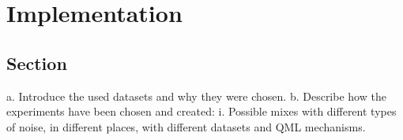 \chapter{Implementation}\label{chapter:implementation}

\section{Section}
a.	Introduce the used datasets and why they were chosen.
b.	Describe how the experiments have been chosen and created:
    i.	Possible mixes with different types of noise, in different places, with different datasets and QML mechanisms.
